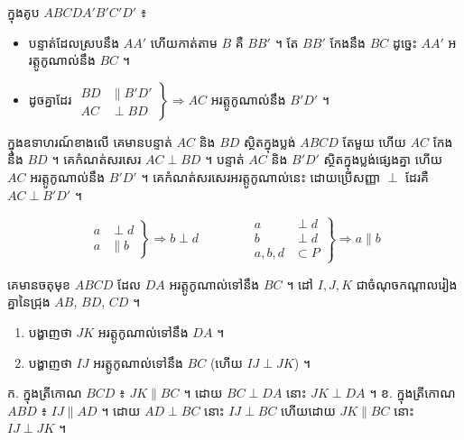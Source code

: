 \begin{example}[លំហាត់គំរូ]
ក្នុងគូប $ABCDA'B'C'D'$ ៖
\end{example}
\begin{itemize}
  \item បន្ទាត់ដែលស្របនឹង $AA'$ ហើយកាត់តាម $B$ គឺ $BB'$ ។ តែ $BB'$ កែងនឹង $BC$ ដូច្នេះ $AA'$ អរត្តូកូណាល់នឹង $BC$ ។
  \item ដូចគ្នាដែរ $\left.\begin{aligned} BD &\parallel B'D'\\ AC &\perp BD \end{aligned}\right\} \Rightarrow AC$ អរត្តូកូណាល់នឹង $B'D'$ ។
\end{itemize}
\begin{note}[សម្គាល់]
ក្នុងឧទាហរណ៍ខាងលើ គេមានបន្ទាត់ $AC$ និង $BD$ ស្ថិតក្នុងប្លង់ $ABCD$ តែមួយ ហើយ $AC$ កែងនឹង $BD$ ។ គេកំណត់សរសេរ $AC \perp BD$ ។ បន្ទាត់ $AC$ និង $B'D'$ ស្ថិតក្នុងប្លង់ផ្សេងគ្នា ហើយ $AC$ អរត្តូកូណាល់នឹង $B'D'$ ។ គេកំណត់សរសេរអរត្តូកូណាល់នេះ ដោយប្រើសញ្ញា $\perp$ ដែរគឺ $AC \perp B'D'$ ។
\end{note}
\begin{theorem}[វិបាក]
\[
\left.\begin{aligned} a &\perp d\\ a &\parallel b \end{aligned}\right\} \Rightarrow b \perp d
\qquad\qquad
\left.\begin{aligned} a &\perp d\\ b &\perp d\\ a, b, d &\subset P \end{aligned}\right\} \Rightarrow a \parallel b
\]
\end{theorem}

\begin{pro}
គេមានចតុមុខ $ABCD$ ដែល $DA$ អរត្តូកូណាល់ទៅនឹង $BC$ ។ ដៅ $I, J, K$ ជាចំណុចកណ្ដាលរៀងគ្នានៃជ្រុង $AB$, $BD$, $CD$ ។
\begin{enumerate}[a]
  \item បង្ហាញថា $JK$ អរត្តូកូណាល់ទៅនឹង $DA$ ។
  \item បង្ហាញថា $IJ$ អរត្តូកូណាល់ទៅនឹង $BC$ (ហើយ $IJ \perp JK$) ។
\end{enumerate}
\ans
ក. ក្នុងត្រីកោណ $BCD$ ៖ $JK \parallel BC$ ។ ដោយ $BC \perp DA$ នោះ $JK \perp DA$ ។ \quad ខ. ក្នុងត្រីកោណ $ABD$ ៖ $IJ \parallel AD$ ។ ដោយ $AD \perp BC$ នោះ $IJ \perp BC$ ហើយដោយ $JK \parallel BC$ នោះ $IJ \perp JK$ ។
\end{pro}

